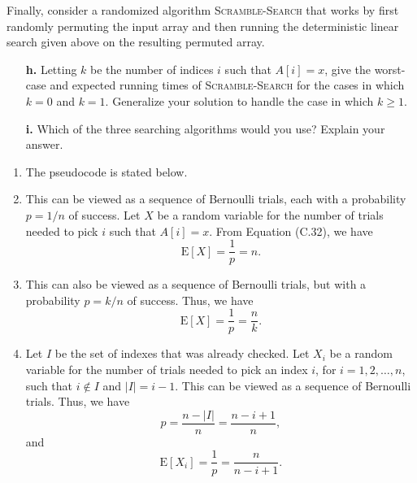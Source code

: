 \begin{enumerate}
{Finally, consider a randomized algorithm \textsc{Scramble-Search} that works by
first randomly permuting the input array and then running the deterministic
linear search given above on the resulting permuted array.

\begin{enumerate}
\item[\textbf{h.}] Letting $k$ be the number of indices $i$ such that
$A[i] = x$, give the worst-case and expected running times of
\textsc{Scramble-Search} for the cases in which $k = 0$ and $k = 1$. Generalize
your solution to handle the case in which $k \ge 1$.
\item[\textbf{i.}] Which of the three searching algorithms would you use?
Explain your answer.
\end{enumerate}
}

\begin{framed}
\begin{enumerate}
\item The pseudocode is stated below.

\begin{algorithm}[H]
\SetAlgoNoEnd\DontPrintSemicolon
\BlankLine
{}
\end{algorithm}

\item This can be viewed as a sequence of Bernoulli trials, each with
a probability $p = 1/n$ of success. Let $X$ be a random variable for the number
of trials needed to pick $i$ such that $A[i] = x$. From Equation (C.32), we have
\[
  \text{E}[X] = \frac{1}{p} = n.
\]

\item This can also be viewed as a sequence of Bernoulli trials, but with
a probability $p = k/n$ of success. Thus, we have
\[
  \text{E}[X] = \frac{1}{p} = \frac{n}{k}.
\]

\item Let $I$ be the set of indexes that was already checked. Let $X_i$ be
a random variable for the number of trials needed to pick an index $i$, for
$i = 1, 2, \dots, n$, such that $i \notin I$ and $|I| = i - 1$. This can be
viewed as a sequence of Bernoulli trials. Thus, we have
\[
  p = \frac{n - |I|}{n} = \frac{n - i + 1}{n},
\]
and
\[
  \text{E}[X_i] = \frac{1}{p} = \frac{n}{n - i + 1}.
\]


\end{enumerate}
\end{framed}
\end{enumerate}
